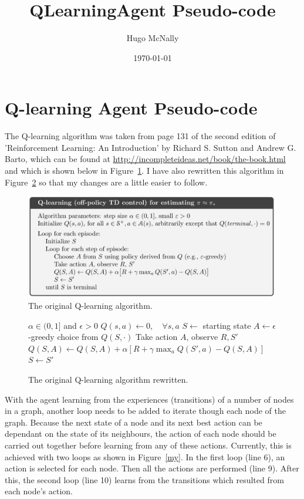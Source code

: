 \documentclass[a4paper]{article}
\title{QLearningAgent Pseudo-code}
\date{\today}
\author{Hugo McNally}
\begin{document}
\large
\section*{Q-learning Agent Pseudo-code}

The Q-learning algorithm was taken from page 131 of the second edition of
'Reinforcement Learning: An Introduction'
by Richard S. Sutton and Andrew G. Barto,
which can be found at \url{http://incompleteideas.net/book/the-book.html}
and which is shown below in Figure~\ref{orig}.
I have also rewritten this algorithm in Figure~\ref{orig-re}
so that my changes are a little easier to follow.

\begin{figure}[H]
\begin{center}
    \includegraphics[width=30em]{Q-learning_algorithm.png}
\end{center}
\caption{The original Q-learning algorithm.}
\label{orig}
\end{figure}

\begin{figure}[H]
\begin{framed}
\begin{algorithmic}[1]
    \REQUIRE $\alpha \in (0, 1]$ and $\epsilon > 0$
    \STATE $Q(s, a) \gets 0, \quad\forall s, a$
    \STATE $S \gets$ starting state
    \REPEAT
    \STATE $A \gets \epsilon$-greedy choice from $Q(S, \cdot)$
    \STATE Take action $A$, observe $R, S'$
    \STATE $Q(S, A) \leftarrow Q(S, A)
    + \alpha [R + \gamma \max_a Q(S', a) - Q(S, A)]$
    \STATE $S \gets S'$
    \ENDFOR
\end{algorithmic}
\end{framed}
\caption{The original Q-learning algorithm rewritten.}
\label{orig-re}
\end{figure}

With the agent learning from the experiences (transitions)
of a number of nodes in a graph,
another loop needs to be added to iterate though each node of the graph.
Because the next state of a node and its next best action
can be dependant on the state of its neighbours,
the action of each node should be carried out together
before learning from any of these actions.
Currently, this is achieved with two loops as shown in Figure~\ref{my}.
In the first loop (line 6),
an action is selected for each node.
Then all the actions are performed (line 9).
After this,
the second loop (line 10) learns from the transitions
which resulted from each node's action.
\end{document}
